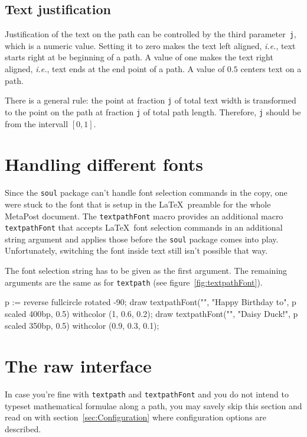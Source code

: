 \documentclass{article}
\newcommand*{\cmd}[1]{\texttt{#1}}
\newenvironment{listing}{%
  \small%
  \verbatim%
}{%
  \endverbatim%
}
\begin{document}
\subsection{Text justification}
Justification of the text on the path can be controlled by the third parameter~\cmd{j}, which is a numeric value.  Setting it to zero makes the text left aligned, \emph{i.e.}, text starts right at be beginning of a path.  A value of one makes the text right aligned, \emph{i.e.}, text ends at the end point of a path.  A value of $0.5$ centers text on a path.

There is a general rule:  the point at fraction \cmd{j} of total text width is transformed to the point on the path at fraction \cmd{j} of total path length.  Therefore, \cmd{j} should be from the intervall $[0,1]$.



\section{Handling different fonts}\label{sec:textpathFont}
Since the \cmd{soul} package can't handle font selection commands in the copy, one were stuck to the font that is setup in the \LaTeX\ preamble for the whole MetaPost document.  The \cmd{textpathFont} macro provides an additional macro \cmd{textpathFont} that accepts \LaTeX\ font selection commands in an additional string argument and applies those before the \cmd{soul} package comes into play.  Unfortunately, switching the font inside text still isn't possible that way.

The font selection string has to be given as the first argument.  The remaining arguments are the same as for \cmd{textpath} (see figure~\ref{fig:textpathFont}).  

\begin{listing}
p := reverse fullcircle rotated -90;
draw textpathFont("\huge", "Happy Birthday to",
  p scaled 400bp, 0.5) withcolor (1, 0.6, 0.2);
draw textpathFont("\large", "Daisy Duck!",
  p scaled 350bp, 0.5) withcolor (0.9, 0.3, 0.1);
\end{listing}



\section{The raw interface}\label{sec:textpathRaw}
In case you're fine with \cmd{textpath} and \cmd{textpathFont} and you do not intend to typeset mathematical formulae along a path, you may savely skip this section and read on with section~\ref{sec:Configuration} where configuration options are described.
\end{document}
